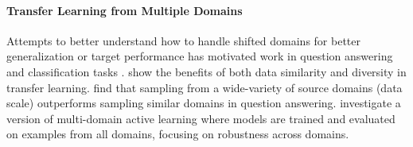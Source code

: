 \respace
\paragraph{Transfer Learning from Multiple Domains}
Attempts to better understand how to handle shifted domains for better generalization or target performance has motivated work in question answering \citep{talmor2019multiqa, fisch2019mrqa, longpre2019exploration, kamath2020selective} and classification tasks \citep{ruder2018strong, sheoran2020recommendation}.
\citet{ruder2017learning} show the benefits of both data similarity and diversity in transfer learning.
\citet{ruckle2020multicqa} find that sampling from a wide-variety of source domains (data scale) outperforms sampling similar domains in question answering.
\citet{he2021multi} investigate a version of multi-domain active learning where models are trained and evaluated on examples from all domains, focusing on robustness across domains.